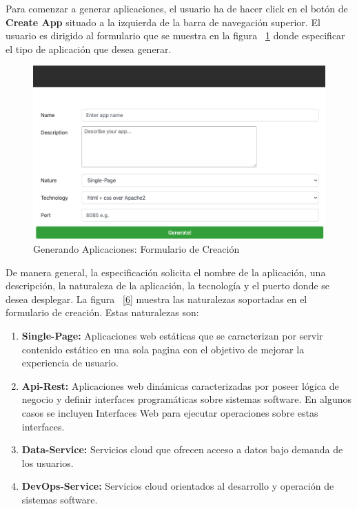 \documentclass[a4paper,11pt]{book}
\begin{document}
Para comenzar a generar aplicaciones, el usuario ha de hacer click en el botón de \textbf{Create App} situado a la izquierda de la barra de navegación superior. El usuario es dirigido al formulario que se muestra en la figura   ~\ref{5}  donde especificar el tipo de aplicación que desea generar. 

\begin{figure}[H]
\centering
\includegraphics[scale=0.45]{imagenes/casouso_a/5.png}
\caption{ Generando Aplicaciones: Formulario de Creación  }
\label{5}
\end{figure}

De manera general, la especificación solicita el nombre de la aplicación, una descripción, la naturaleza de la aplicación, la tecnología y el puerto donde se desea desplegar. La figura ~\ref{6} muestra las naturalezas soportadas en el formulario de creación. Estas naturalezas son:

\begin{enumerate}
\item \textbf{ Single-Page: } Aplicaciones web estáticas que se caracterizan por servir contenido estático en una sola pagina con el objetivo de mejorar la experiencia de usuario. 
\item \textbf{ Api-Rest: } Aplicaciones web dinámicas caracterizadas por poseer lógica de negocio y definir interfaces programáticas sobre sistemas software. En algunos casos se incluyen Interfaces Web para ejecutar operaciones sobre estas interfaces.  
\item \textbf{ Data-Service:} Servicios cloud que ofrecen acceso a datos bajo demanda de los usuarios. 
\item \textbf{ DevOps-Service: } Servicios cloud orientados al desarrollo y operación de sistemas software. 
\end{enumerate}
\end{document}
